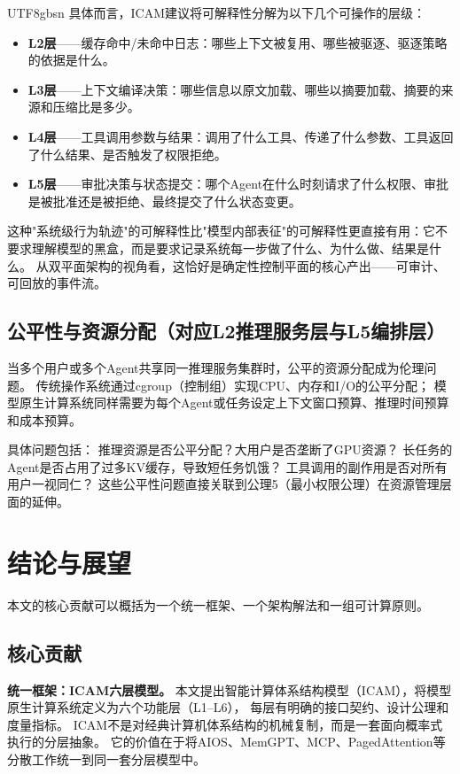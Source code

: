 \documentclass[11pt,a4paper]{article}
\begin{document}
\begin{CJK*}{UTF8}{gbsn}
具体而言，ICAM建议将可解释性分解为以下几个可操作的层级：

\begin{itemize}[nosep]
\item \textbf{L2层}——缓存命中/未命中日志：哪些上下文被复用、哪些被驱逐、驱逐策略的依据是什么。
\item \textbf{L3层}——上下文编译决策：哪些信息以原文加载、哪些以摘要加载、摘要的来源和压缩比是多少。
\item \textbf{L4层}——工具调用参数与结果：调用了什么工具、传递了什么参数、工具返回了什么结果、是否触发了权限拒绝。
\item \textbf{L5层}——审批决策与状态提交：哪个Agent在什么时刻请求了什么权限、审批是被批准还是被拒绝、最终提交了什么状态变更。
\end{itemize}

这种"系统级行为轨迹"的可解释性比"模型内部表征"的可解释性更直接有用：它不要求理解模型的黑盒，而是要求记录系统每一步做了什么、为什么做、结果是什么。
从双平面架构的视角看，这恰好是确定性控制平面的核心产出——可审计、可回放的事件流。

\subsection{公平性与资源分配（对应L2推理服务层与L5编排层）}

当多个用户或多个Agent共享同一推理服务集群时，公平的资源分配成为伦理问题。
传统操作系统通过cgroup（控制组）实现CPU、内存和I/O的公平分配\cite{linux_cgroup_2026}；
模型原生计算系统同样需要为每个Agent或任务设定上下文窗口预算、推理时间预算和成本预算。

具体问题包括：
推理资源是否公平分配？大用户是否垄断了GPU资源？
长任务的Agent是否占用了过多KV缓存，导致短任务饥饿？
工具调用的副作用是否对所有用户一视同仁？
这些公平性问题直接关联到公理5（最小权限公理）在资源管理层面的延伸。

\section{结论与展望}
\label{sec:conclusion}

本文的核心贡献可以概括为一个统一框架、一个架构解法和一组可计算原则。

\subsection{核心贡献}

\textbf{统一框架：ICAM六层模型。}
本文提出智能计算体系结构模型（ICAM），将模型原生计算系统定义为六个功能层（L1--L6），
每层有明确的接口契约、设计公理和度量指标。
ICAM不是对经典计算机体系结构的机械复制，而是一套面向概率式执行的分层抽象。
它的价值在于将AIOS\cite{mei2024aios}、MemGPT\cite{memgpt2023}、MCP\cite{mcp_intro_2026}、PagedAttention\cite{kwon2023pagedattention}等分散工作统一到同一套分层模型中。


\end{CJK*}
\end{document}
